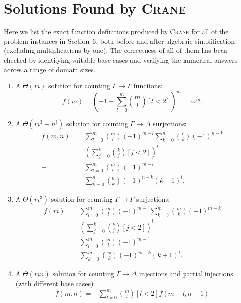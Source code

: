 \documentclass{article}
\begin{document}
\section{Solutions Found by \textsc{Crane}}

Here we list the exact function definitions produced by \textsc{Crane} for all
of the problem instances in Section~6, both before and after algebraic
simplification (excluding multiplications by one). The correctness of all of
them has been checked by identifying suitable base cases and verifying the
numerical answers across a range of domain sizes.

\begin{enumerate}
  \item A $\Theta(m)$ solution for counting $\Gamma \to \Gamma$ functions:
        \[
        f(m) = {\left(-1 + \sum_{l=0}^{m} \binom{m}{l} [l < 2]\right)}^{m} = m^{m}.
        \]
  \item A $\Theta(m^3 + n^3)$ solution for counting $\Gamma \to \Delta$
        surjections:
        \begin{align*}
          f(m, n) ={}& \sum_{l=0}^{m} \binom{m}{l}{(-1)}^{m-l} \sum_{k=0}^{n} \binom{n}{k} {(-1)}^{n-k}\\
                     &{\left( \sum_{j=0}^{k} \binom{k}{j} [j < 2] \right)}^{l} \\
          ={}& \sum_{l=0}^{m} \binom{m}{l}{(-1)}^{m-l}\\
                     &\sum_{k=0}^{n} \binom{n}{k} {(-1)}^{n-k} {(k+1)}^{l}.
        \end{align*}
  \item A $\Theta(m^{3})$ solution for counting $\Gamma \to \Gamma$ surjections:
        \begin{align*}
          f(m) ={}& \sum_{l=0}^{m} \binom{m}{l}{(-1)}^{m-l} \sum_{k=0}^{m} \binom{m}{k} {(-1)}^{m-k}\\
                  &{\left( \sum_{j=0}^{k} \binom{k}{j} [j < 2] \right)}^{l} \\
          ={}& \sum_{l=0}^{m} \binom{m}{l}{(-1)}^{m-l}\\
                  &\sum_{k=0}^{m} \binom{m}{k} {(-1)}^{m-k} {(k+1)}^{l}.
        \end{align*}
  \item A $\Theta(mn)$ solution for counting $\Gamma \to \Delta$ injections and
        partial injections (with different base cases):
        \begin{align*}
          f(m, n) ={}& \sum_{l=0}^m \binom{m}{l} [l<2] f(m-l, n-1)\\

\end{align*}
\end{enumerate}
\end{document}
